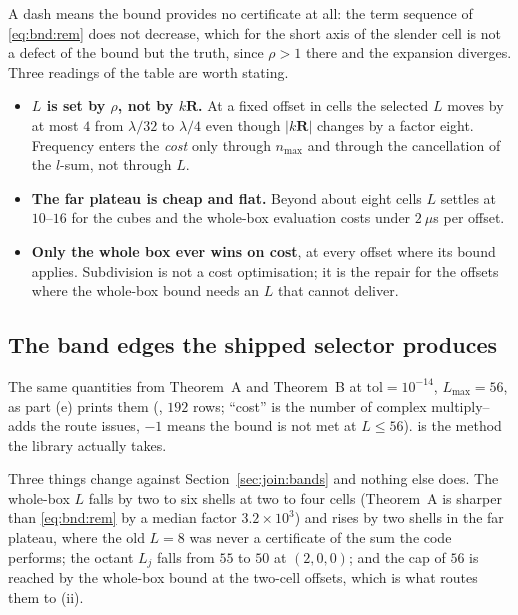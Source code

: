 \noindent
A dash means the bound provides no certificate at all: the term sequence of
\eqref{eq:bnd:rem} does not decrease, which for the short axis of the slender cell is not
a defect of the bound but the truth, since $\rho > 1$ there and the expansion diverges.
Three readings of the table are worth stating.

\begin{itemize}[nosep,leftmargin=1.4em]
\item \textbf{$L$ is set by $\rho$, not by $k\mathbf{R}$.} At a fixed offset in cells the
selected $L$ moves by at most $4$ from $\lambda/32$ to $\lambda/4$ even though
$|k\mathbf{R}|$ changes by a factor eight. Frequency enters the \emph{cost} only through
$n_{\max}$ and through the cancellation of the $l$-sum, not through $L$.
\item \textbf{The far plateau is cheap and flat.} Beyond about eight cells $L$ settles at
$10$--$16$ for the cubes and the whole-box evaluation costs under $2~\mu$s per offset.
\item \textbf{Only the whole box ever wins on cost}, at every offset where its bound
applies. Subdivision is not a cost optimisation; it is the repair for the offsets where
the whole-box bound needs an $L$ that  cannot deliver.
\end{itemize}

\subsection{The band edges the shipped selector produces}
\label{sec:join:ship}

The same quantities from Theorem~A and Theorem~B at $\mathrm{tol} = 10^{-14}$,
$L_{\max} = 56$, as  part (e) prints them
(, $192$ rows; ``cost'' is the number of complex multiply--adds
the route issues, $-1$ means the bound is not met at $L \le 56$).  is the
method the library actually takes.

\begin{center}\footnotesize

\end{center}

\noindent
Three things change against Section~\ref{sec:join:bands} and nothing else does. The
whole-box $L$ falls by two to six shells at two to four cells (Theorem~A is sharper than
\eqref{eq:bnd:rem} by a median factor $3.2\times10^{3}$) and rises by two shells in the far
plateau, where the old $L = 8$ was never a certificate of the sum the code performs; the
octant $L_j$ falls from $55$ to $50$ at $(2,0,0)$; and the cap of $56$ is reached by the
whole-box bound at the two-cell offsets, which is what routes them to (ii).

